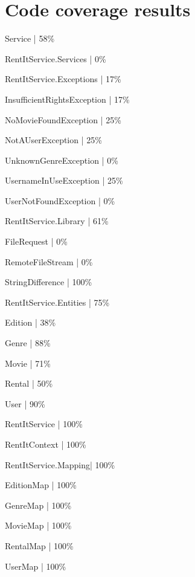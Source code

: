 \section{Code coverage results}
\label{Appendix_Test_Coverage}
\begin{my_itemize}
	\item Service | 58\%
	\begin{my_itemize}
	\item RentItService.Services | 0\%
	\item RentItService.Exceptions | 17\%
		\begin{my_itemize}
		\item InsufficientRightsException | 17\%
		\item NoMovieFoundException | 25\%
		\item NotAUserException | 25\%
		\item UnknownGenreException | 0\%
		\item UsernameInUseException | 25\%
		\item UserNotFoundException | 0\%
		\end{my_itemize}
	\item RentItService.Library | 61\%
		\begin{my_itemize}
		\item FileRequest | 0\%
		\item RemoteFileStream | 0\%
		\item StringDifference | 100\%
		\end{my_itemize}
	\item RentItService.Entities | 75\%
		\begin{my_itemize}
		\item Edition | 38\%
		\item Genre | 88\%
		\item Movie | 71\%
		\item Rental | 50\%
		\item User | 90\%
		\end{my_itemize}
	\item RentItService | 100\%
		\begin{my_itemize}
		\item RentItContext | 100\%
		\end{my_itemize}
	\item RentItService.Mapping| 100\%
		\begin{my_itemize}
		\item EditionMap | 100\%
		\item GenreMap | 100\%
		\item  MovieMap | 100\%
		\item RentalMap | 100\%
		\item UserMap | 100\%
		\end{my_itemize}
	\end{my_itemize}
\end{my_itemize}